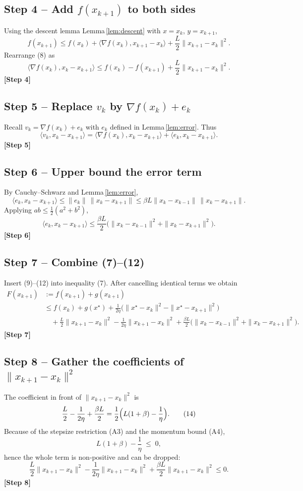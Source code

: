\documentclass{article}
\begin{document}
\subsection*{Step 4 – Add $f(x_{k+1})$ to both sides}
Using the descent lemma Lemma \ref{lem:descent} with $x=x_k$, $y=x_{k+1}$,
\[
f(x_{k+1})\le f(x_k)+\langle\nabla f(x_k),x_{k+1}-x_k\rangle+\frac{L}{2}\|x_{k+1}-x_k\|^{2}.
\tag{8}
\]
Rearrange (8) as
\[
\langle\nabla f(x_k),x_k-x_{k+1}\rangle
\le f(x_k)-f(x_{k+1})+\frac{L}{2}\|x_{k+1}-x_k\|^{2}.
\tag{9}
\]
\textbf{[Step 4]}

\subsection*{Step 5 – Replace $v_k$ by $\nabla f(x_k)+e_k$}
Recall $v_k=\nabla f(x_k)+e_k$ with $e_k$ defined in Lemma \ref{lem:error}.  
Thus
\[
\langle v_k, x_k-x_{k+1}\rangle
= \langle\nabla f(x_k),x_k-x_{k+1}\rangle+\langle e_k, x_k-x_{k+1}\rangle.
\tag{10}
\]
\textbf{[Step 5]}

\subsection*{Step 6 – Upper bound the error term}
By Cauchy–Schwarz and Lemma \ref{lem:error},
\[
\langle e_k, x_k-x_{k+1}\rangle
\le \|e_k\|\,\|x_k-x_{k+1}\|
\le \beta L\|x_k-x_{k-1}\|\,\|x_k-x_{k+1}\|.
\tag{11}
\]
Applying $ab\le\frac{1}{2}(a^{2}+b^{2})$,
\[
\langle e_k, x_k-x_{k+1}\rangle
\le \frac{\beta L}{2}\bigl(\|x_k-x_{k-1}\|^{2}+\|x_k-x_{k+1}\|^{2}\bigr).
\tag{12}
\]
\textbf{[Step 6]}

\subsection*{Step 7 – Combine (7)–(12)}
Insert (9)–(12) into inequality (7). After cancelling identical terms we obtain
\[
\begin{aligned}
F(x_{k+1}) &:= f(x_{k+1})+g(x_{k+1})\\
&\le f(x_k)+g(x^{\star})+\frac{1}{2\eta}\bigl(\|x^{\star}-x_k\|^{2}-\|x^{\star}-x_{k+1}\|^{2}\bigr)\\
&\quad +\frac{L}{2}\|x_{k+1}-x_k\|^{2}
-\frac{1}{2\eta}\|x_{k+1}-x_k\|^{2}
+\frac{\beta L}{2}\bigl(\|x_k-x_{k-1}\|^{2}+\|x_k-x_{k+1}\|^{2}\bigr).
\end{aligned}
\tag{13}
\]
\textbf{[Step 7]}

\subsection*{Step 8 – Gather the coefficients of $\|x_{k+1}-x_k\|^{2}$}
The coefficient in front of $\|x_{k+1}-x_k\|^{2}$ is
\[
\frac{L}{2}-\frac{1}{2\eta}+\frac{\beta L}{2}
= \frac{1}{2}\Bigl(L(1+\beta)-\frac{1}{\eta}\Bigr).
\tag{14}
\]
Because of the stepsize restriction (A3) and the momentum bound (A4),
\[
L(1+\beta)-\frac{1}{\eta}\;\le\;0,
\]
hence the whole term is non‑positive and can be dropped:
\[
\frac{L}{2}\|x_{k+1}-x_k\|^{2}
-\frac{1}{2\eta}\|x_{k+1}-x_k\|^{2}
+\frac{\beta L}{2}\|x_{k+1}-x_k\|^{2}
\le 0.
\tag{15}
\]
\textbf{[Step 8]}
\end{document}
